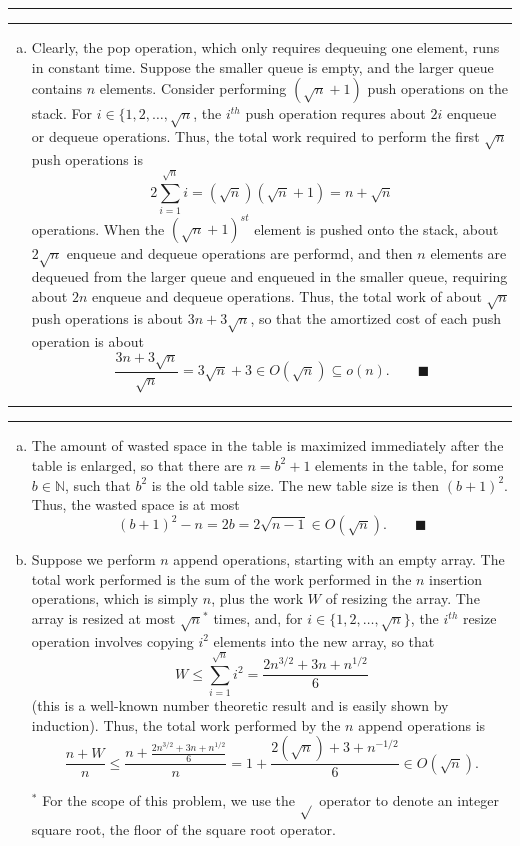 \documentclass[11pt]{article}
\newcounter{questionCounter}
\newcounter{partCounter}[questionCounter]
\newenvironment{question}[2][\arabic{questionCounter}]{%
    \setcounter{partCounter}{0}%
    \vspace{.25in} \hrule \vspace{0.5em}%
        \noindent{\bf #2}%
    \vspace{0.8em} \hrule \vspace{.10in}%
    \addtocounter{questionCounter}{1}%
}{}
\begin{document}
\begin{question}{Stacks n' Queues}
\begin{enumerate}[(a)]
\item Clearly, the pop operation, which only requires dequeuing one element,
runs in constant time. Suppose the smaller queue is empty, and the larger
queue contains $n$ elements. Consider performing $(\sqrt{n} + 1)$ push
operations on the stack. For $i \in \{1,2,\ldots,\sqrt{n}$, the $i^{th}$ push
operation requres about $2i$ enqueue or dequeue operations. Thus, the total
work required to perform the first $\sqrt{n}$ push operations is
\[2\sum_{i = 1}^{\sqrt{n}} i = (\sqrt{n})(\sqrt{n} + 1)
 = n + \sqrt{n}\] operations. When the $(\sqrt{n} + 1)^{st}$ element
is pushed onto the stack, about $2\sqrt{n}$ enqueue and dequeue operations are
performd, and then $n$ elements are dequeued from the larger queue and
enqueued in the smaller queue, requiring about $2n$ enqueue and dequeue
operations. Thus, the total work of about $\sqrt{n}$ push operations is about
$3n + 3\sqrt{n}$, so that the amortized cost of each push operation is about
\[\frac{3n + 3\sqrt{n}}{\sqrt{n}} = 3\sqrt{n} + 3 \in O(\sqrt{n})
 \subseteq o(n). \qquad \blacksquare\]
\end{enumerate}
\end{question}

\begin{question}{Dynamic Array}
\begin{enumerate}[(a)]
\item The amount of wasted space in the table is maximized immediately after
the table is enlarged, so that there are $n = b^2 + 1$ elements in the table,
for some $b \in \mathbb{N}$, such that $b^2$ is the old table size. The new table
size is then $(b + 1)^2$. Thus, the wasted space is at most
\[(b + 1)^2 - n = 2b = 2 \sqrt{n - 1}\in O(\sqrt{n}). \qquad \blacksquare\]

\item Suppose we perform $n$ append operations, starting with an empty array.
The total work performed is the sum of the work performed in the $n$ insertion
operations, which is simply $n$, plus the work $W$ of resizing the array.
The array is resized at most $\sqrt{n}^*$ times, and, for
$i \in \{1,2,\ldots,\sqrt{n}\}$, the $i^{th}$ resize operation
involves copying $i^2$ elements into the new array, so that
\[W \leq \sum_{i = 1}^{\sqrt{n}} i^2
    = \frac{2n^{3/2} + 3n + n^{1/2}}{6}\]
(this is a well-known number theoretic result and is easily shown by
induction). Thus, the total work performed by the $n$ append operations is
\[\frac{n + W}{n}  \leq \frac{n + \frac{2n^{3/2} + 3n + n^{1/2}}{6}}{n}
= 1 + \frac{2(\sqrt{n}) + 3 + n^{-1/2}}{6} \in O(\sqrt{n}).\]

$^*$ For the scope of this problem, we use the $\sqrt{}$ operator to denote an
integer square root, the floor of the square root operator.

\end{enumerate}
\end{question}
\end{document}
